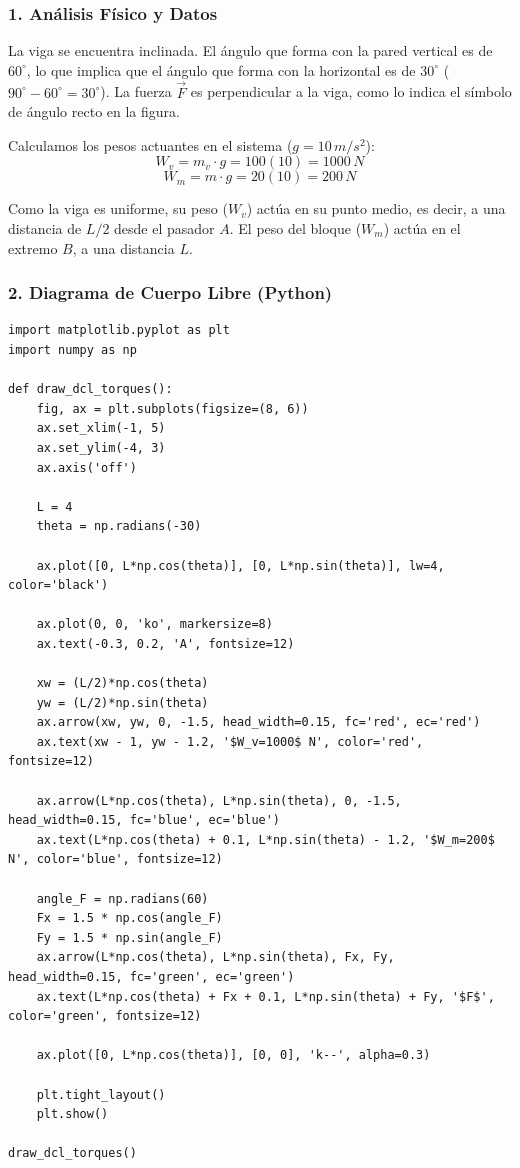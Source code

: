 \documentclass[12pt, a4paper]{article}
\begin{document}
\subsubsection*{1. Análisis Físico y Datos}
La viga se encuentra inclinada. El ángulo que forma con la pared vertical es de $60^\circ$, lo que implica que el ángulo que forma con la horizontal es de $30^\circ$ ($90^\circ - 60^\circ = 30^\circ$).
La fuerza $\vec{F}$ es perpendicular a la viga, como lo indica el símbolo de ángulo recto en la figura.

Calculamos los pesos actuantes en el sistema ($g = 10 \, \si{m/s^2}$):
$$W_v = m_v \cdot g = 100(10) = 1000 \, \si{N}$$
$$W_m = m \cdot g = 20(10) = 200 \, \si{N}$$

Como la viga es uniforme, su peso ($W_v$) actúa en su punto medio, es decir, a una distancia de $L/2$ desde el pasador $A$. El peso del bloque ($W_m$) actúa en el extremo $B$, a una distancia $L$.

\subsubsection*{2. Diagrama de Cuerpo Libre (Python)}

\begin{lstlisting}
import matplotlib.pyplot as plt
import numpy as np

def draw_dcl_torques():
    fig, ax = plt.subplots(figsize=(8, 6))
    ax.set_xlim(-1, 5)
    ax.set_ylim(-4, 3)
    ax.axis('off')
    
    L = 4
    theta = np.radians(-30)
    
    ax.plot([0, L*np.cos(theta)], [0, L*np.sin(theta)], lw=4, color='black')
    
    ax.plot(0, 0, 'ko', markersize=8)
    ax.text(-0.3, 0.2, 'A', fontsize=12)
    
    xw = (L/2)*np.cos(theta)
    yw = (L/2)*np.sin(theta)
    ax.arrow(xw, yw, 0, -1.5, head_width=0.15, fc='red', ec='red')
    ax.text(xw - 1, yw - 1.2, '$W_v=1000$ N', color='red', fontsize=12)
    
    ax.arrow(L*np.cos(theta), L*np.sin(theta), 0, -1.5, head_width=0.15, fc='blue', ec='blue')
    ax.text(L*np.cos(theta) + 0.1, L*np.sin(theta) - 1.2, '$W_m=200$ N', color='blue', fontsize=12)
    
    angle_F = np.radians(60)
    Fx = 1.5 * np.cos(angle_F)
    Fy = 1.5 * np.sin(angle_F)
    ax.arrow(L*np.cos(theta), L*np.sin(theta), Fx, Fy, head_width=0.15, fc='green', ec='green')
    ax.text(L*np.cos(theta) + Fx + 0.1, L*np.sin(theta) + Fy, '$F$', color='green', fontsize=12)
    
    ax.plot([0, L*np.cos(theta)], [0, 0], 'k--', alpha=0.3)
    
    plt.tight_layout()
    plt.show()

draw_dcl_torques()
\end{lstlisting}
\end{document}

